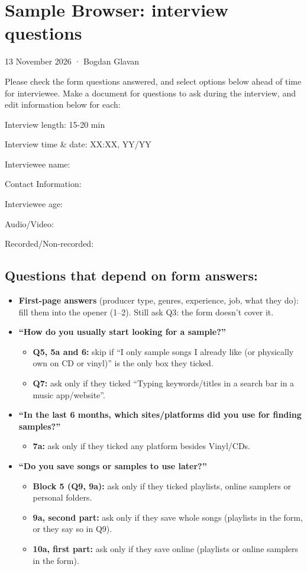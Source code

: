 \documentclass[12pt,a4paper]{report}
\begin{document}
\frenchspacing

\chapter{Sample Browser: interview questions}

13 November 2026 · Bogdan Glavan

Please check the form questions answered, and select options below ahead of time for interviewee. Make a document for questions to ask during the interview, and edit information below for each:

\medskip

Interview length: 15-20 min

Interview time \& date: XX:XX, YY/YY

Interviewee name:

Contact Information:

Interviewee age:

Audio/Video:

Recorded/Non-recorded:

\medskip

\section{Questions that depend on form answers:}

\begin{itemize}
  \item \textbf{First-page answers} (producer type, genres, experience, job, what they do): fill them into the opener (1–2). Still ask Q3: the form doesn’t cover it.
  \item \textbf{“How do you usually start looking for a sample?”}
\begin{itemize}
  \item \textbf{Q5, 5a and 6:} skip if “I only sample songs I already like (or physically own on CD or vinyl)” is the only box they ticked.
  \item \textbf{Q7:} ask only if they ticked “Typing keywords/titles in a search bar in a music app/website”.
\end{itemize}
  \item \textbf{“In the last 6 months, which sites/platforms did you use for finding samples?”}
\begin{itemize}
  \item \textbf{7a:} ask only if they ticked any platform besides Vinyl/CDs.
\end{itemize}
  \item \textbf{“Do you save songs or samples to use later?”}
\begin{itemize}
  \item \textbf{Block 5 (Q9, 9a):} ask only if they ticked playlists, online samplers or personal folders.
  \item \textbf{9a, second part:} ask only if they save whole songs (playlists in the form, or they say so in Q9).
  \item \textbf{10a, first part:} ask only if they save online (playlists or online samplers in the form).
\end{itemize}
\end{itemize}
\end{document}
